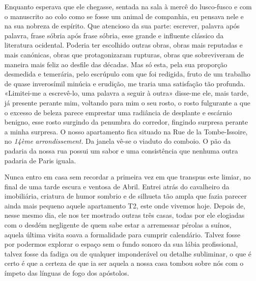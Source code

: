 Enquanto esperava que ele chegasse, sentada na sala à
mercê do lusco-fusco e com o manuscrito ao colo como se fosse um animal
de companhia, eu pensava nele e na sua nobreza de espírito. Que
atencioso da sua parte: escrever, palavra após palavra, frase sóbria
após frase sóbria, esse grande e influente clássico da literatura
ocidental. Poderia ter escolhido outras obras, obras mais reputadas e
mais canónicas, obras que protagonizaram rupturas, obras que
sobreviveram de maneira mais feliz ao desfile das décadas. Mas só
esta, pela sua proporção desmedida e temerária, pelo escrúpulo com que
foi redigida, fruto de um trabalho de quase inverosímil minúcia e
erudição, me traria uma satisfação tão profunda. «Limitei-me a
escrevê-lo, uma palavra a seguir à outra» disse-me ele, mais tarde, já
presente perante mim, voltando para mim o seu rosto, o rosto
fulgurante a que o excesso de beleza parece emprestar uma radiância de
desplante e escárnio benigno, esse rosto surgindo da penumbra do
corredor, fingindo surpresa perante a minha surpresa. O nosso
apartamento fica situado na Rue de la Tombe-Issoire, no \emph{14ème
arrondissement. }Da janela vê-se o viaduto do comboio. O pão da padaria
da nossa rua possui um sabor e uma consistência que nenhuma outra
padaria de Paris iguala.

Nunca entro em casa sem recordar a primeira vez em que transpus este
limiar, no final de uma tarde escura e ventosa de Abril. Entrei atrás do
cavalheiro da imobiliária, criatura de humor sombrio e de silhueta tão
ampla que fazia parecer ainda mais pequeno aquele apartamento T2, este
onde vivemos hoje. Depois de, nesse mesmo dia, ele nos ter mostrado
outras três casas, todas por ele elogiadas com o desdém negligente de
quem sabe estar a arremessar pérolas a suínos, aquela última visita
soava a formalidade para cumprir calendário. Talvez fosse por podermos
explorar o espaço sem o fundo
sonoro da sua lábia profissional, talvez fosse da fadiga ou de qualquer
imponderável ou detalhe subliminar, o que é certo é que a certeza de que
ia ser aquela a nossa casa tombou sobre nós com o ímpeto das línguas de
fogo dos apóstolos.

